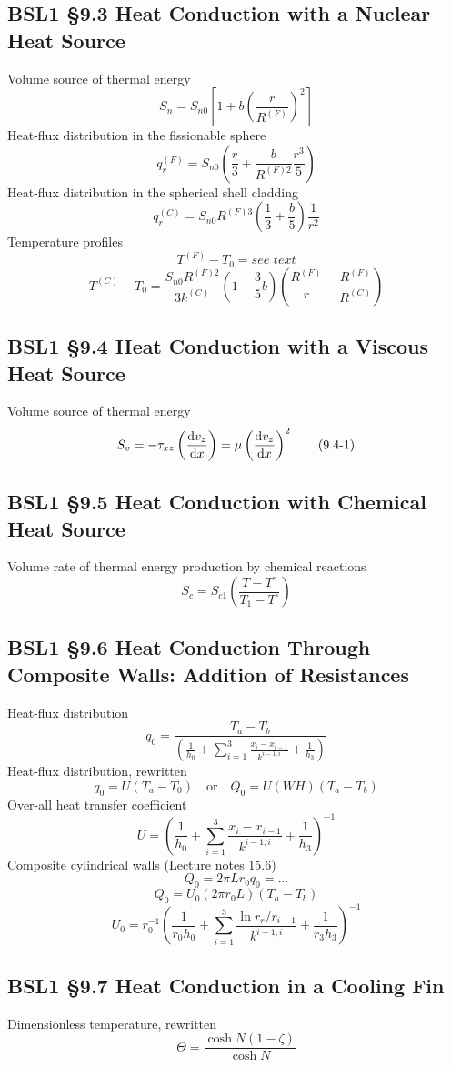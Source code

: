 \subsection{BSL1 \S9.3 Heat Conduction with a Nuclear Heat Source}
Volume source of thermal energy
\[
	S_n=S_{n0}\left[1+b\left(\frac{r}{R^{(F)}}\right)^2\right]\tag{9.3-1}
\]
Heat-flux distribution in the fissionable sphere
\[
	q_r^{(F)}=S_{n0}\left(\frac{r}{3}+\frac{b}{R^{(F)2}}\frac{r^3}{5}\right)\tag{9.3-12}
\]
Heat-flux distribution in the spherical shell cladding
\[
	q_r^{(C)}=S_{n0}R^{(F)3}\left(\frac{1}{3}+\frac{b}{5}\right)\frac{1}{r^2}\tag{9.3-13}
\]
Temperature profiles
\[
	T^{(F)}-T_0=\textit{see text}\tag{9.3-20}
\]
\[
	T^{(C)}-T_0=\frac{S_{n0}R^{(F)2}}{3k^{(C)}}\left(1+\frac{3}{5}b\right)\left(\frac{R^{(F)}}{r}-\frac{R^{(F)}}{R^{(C)}}\right)\tag{9.3-21}
\]
\subsection{BSL1 \S9.4 Heat Conduction with a Viscous Heat Source}
Volume source of thermal energy
\[
	S_v=-\tau_{xz}\left(\frac{\mathop{}\!\mathrm{d} v_z}{\mathop{}\!\mathrm{d} x}\right)=\mu\left(\frac{\mathop{}\!\mathrm{d} v_z}{\mathop{}\!\mathrm{d} x}\right)^2\tag{9.4-1}
\]
\subsection{BSL1 \S9.5 Heat Conduction with Chemical Heat Source}
Volume rate of thermal energy production by chemical reactions
\[
	S_c=S_{c1}\left(\frac{T-T^\circ}{T_1-T^\circ}\right)\tag{9.5-1}
\]
\subsection{BSL1 \S9.6 Heat Conduction Through Composite Walls: Addition of Resistances}
Heat-flux distribution
\[
	q_0=\frac{T_a-T_b}{\left(\frac{1}{h_0}+\sum_{i=1}^{3}\frac{x_i-x_{i-1}}{k^{i-1,i}}+\frac{1}{h_3}\right)}\tag{9.6-15}
\]
Heat-flux distribution, rewritten
\[
	q_0 = U(T_a-T_0) \quad \text{or} \quad Q_0=U(WH)(T_a-T_b)\tag{9.6-16}
\]
Over-all heat transfer coefficient
\[
	U=\left(\frac{1}{h_0}+\sum_{i=1}^{3}\frac{x_i-x_{i-1}}{k^{i-1,i}}+\frac{1}{h_3}\right)^{-1}\tag{9.6-17}
\]
Composite cylindrical walls (Lecture notes 15.6)
\[
	Q_0 = 2\pi Lr_0q_0 =...\tag{9.6-29}
\]
\[
	Q_0=U_0(2\pi r_0L)(T_a-T_b)\tag{9.6-30}
\]
\[
	U_0=r_0^{-1}\left(\frac{1}{r_0h_0}+\sum_{i=1}^{3}\frac{\ln r_r/r_{i-1}}{k^{i-1,i}}+\frac{1}{r_3h_3}\right)^{-1}\tag{9.6-31}
\]
\subsection{BSL1 \S9.7 Heat Conduction in a Cooling Fin}
Dimensionless temperature, rewritten
\[
	\Theta=\frac{\cosh N(1-\zeta)}{\cosh N}\tag{9.7-13}
\]
